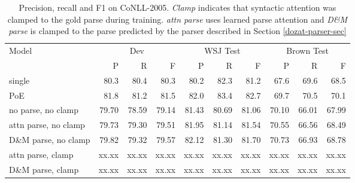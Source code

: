 \documentclass[11pt,a4paper]{article}
\begin{document}
\begin{table*}
\begin{tabular}{lrrrrrrrrr}
\multirow{2}{*}{Model} & \multicolumn{3}{c}{Dev} & \multicolumn{3}{c}{WSJ Test} & \multicolumn{3}{c}{Brown Test} \\
& P & R & F & P & R & F & P & R & F \\ \hline \hline
\citet{he2017deep} single & 80.3 & 80.4 & 80.3 & 80.2 & 82.3 & 81.2 & 67.6&  69.6 & 68.5\\
\citet{he2017deep} PoE & 81.8 &  81.2 & 81.5  & 82.0 & 83.4 & 82.7 & 69.7&  70.5 & 70.1\\ \hline
no parse, no clamp &  79.70 &  78.59 &  79.14 &  81.43 &  80.69 &  81.06 &  70.10  & 66.01  & 67.99\\
attn parse, no clamp &  79.73  & 79.30  & 79.51 & 81.95 &  81.14  & 81.54 & 70.55 &  66.56 &  68.49\\
D\&M parse, no clamp & 79.82 &  79.32  & 79.57 & 82.12  & 81.30 &  81.70 & 70.73 &  66.93 &  68.78\\
attn parse, clamp & xx.xx  & xx.xx  & xx.xx  & xx.xx  & xx.xx  & xx.xx  & xx.xx  & xx.xx  & xx.xx \\
D\&M parse, clamp & xx.xx  & xx.xx  & xx.xx  & xx.xx  & xx.xx  & xx.xx  & xx.xx  & xx.xx  & xx.xx \\

\end{tabular}
\caption{Precision, recall and F1 on CoNLL-2005.  \emph{Clamp} indicates that syntactic attention was clamped to the gold parse during training. \emph{attn parse} uses learned parse attention and \emph{D\&M parse} is clamped to the parse predicted by the parser described in Section \ref{dozat-parser-sec}}

\end{table*}
\end{document}
